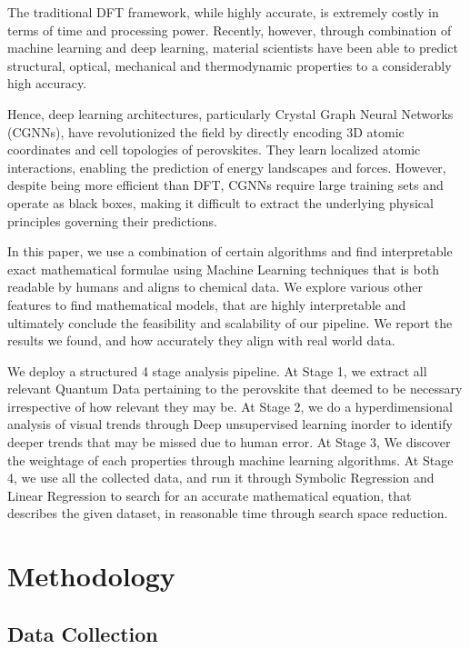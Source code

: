 \documentclass[12pt,onecolumn]{elsarticle}
\begin{document}
The traditional DFT framework, while highly accurate, is extremely costly in terms of time and processing power. Recently, however, through combination of machine learning and deep learning, material scientists have been able to predict structural, optical, mechanical and thermodynamic properties to a considerably high accuracy.

Hence, deep learning architectures, particularly Crystal Graph Neural Networks (CGNNs), have revolutionized the field by directly encoding 3D atomic coordinates and cell topologies of perovskites\cite{zhang2025efficient}. They learn localized atomic interactions, enabling the prediction of energy landscapes and forces. However, despite being more efficient than DFT, CGNNs require large training sets and operate as black boxes, making it difficult to extract the underlying physical principles governing their predictions. 

In this paper, we use a combination of certain algorithms and find interpretable exact mathematical formulae using Machine Learning techniques that is both readable by humans and aligns to chemical data. We explore various other features to find mathematical models, that are highly interpretable and ultimately conclude the feasibility and scalability of our pipeline. We report the results we found, and how accurately they align with real world data.

We deploy a structured 4 stage analysis pipeline. At Stage 1, we extract all relevant Quantum Data pertaining to the perovskite that deemed to be necessary irrespective of how relevant they may be. At Stage 2, we do a hyperdimensional analysis of visual trends through Deep unsupervised learning inorder to identify deeper trends that may be missed due to human error. At Stage 3, We discover the weightage of each properties through machine learning algorithms. At Stage 4, we use all the collected data, and run it through Symbolic Regression and Linear Regression to search for an accurate mathematical equation, that describes the given dataset, in reasonable time through search space reduction.

\section{Methodology}

\subsection{Data Collection}
\end{document}
